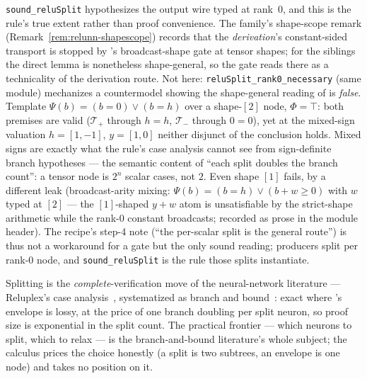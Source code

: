 \begin{bremark}
\label{rem:relusplit-scope}
\texttt{sound\_reluSplit} hypothesizes the output wire typed at
rank~$0$, and this is the rule's true extent rather than proof
convenience. The family's shape-scope remark
(Remark~\ref{rem:relunn-shapescope}) records that the
\emph{derivation}'s constant-sided transport is stopped by
's broadcast-shape gate at tensor shapes; for the
siblings the direct lemma is nonetheless shape-general, so the gate
reads there as a technicality of the derivation route. Not here:
\texttt{reluSplit\_rank0\_necessary} (same module) mechanizes a
countermodel showing the shape-general reading of
 is \emph{false}. Template $\Psi(b) = (b = 0)
\vee (b = h)$ over a shape-$[2]$ node, $\Phi = \top$: both premises
are valid ($\mathcal{T}_{+}$ through $h = h$, $\mathcal{T}_{-}$
through $0 = 0$), yet at the mixed-sign valuation $h = [1, -1]$,
$y = [1, 0]$ neither disjunct of the conclusion holds. Mixed signs
are exactly what the rule's case analysis cannot see from
sign-definite branch hypotheses --- the semantic content of ``each
split doubles the branch count'': a tensor node is $2^{n}$ scalar
cases, not $2$. Even shape $[1]$ fails, by a different leak
(broadcast-arity mixing: $\Psi(b) = (b = h) \vee (b + w \geq 0)$ with
$w$ typed at $[2]$ --- the $[1]$-shaped $y + w$ atom is unsatisfiable
by the strict-shape arithmetic while the rank-$0$ constant broadcasts;
recorded as prose in the module header). The recipe's step-4 note
(``the per-scalar split is the general route'') is thus not a
workaround for a gate but the only sound reading; producers split per
rank-$0$ node, and \texttt{sound\_reluSplit} is the rule those splits
instantiate.
\end{bremark}

\begin{bremark}
Splitting is the \emph{complete}-verification move of the
neural-network literature --- Reluplex's case
analysis~\cite{katz2017reluplex}, systematized as branch and
bound~\cite{bunel2020branch}: exact where 's envelope
is lossy, at the price of one branch doubling per split neuron, so
proof size is exponential in the split count. The practical frontier
--- which neurons to split, which to relax --- is the branch-and-bound
literature's whole subject; the calculus prices the choice honestly
(a split is two subtrees, an envelope is one node) and takes no
position on it.
\end{bremark}

